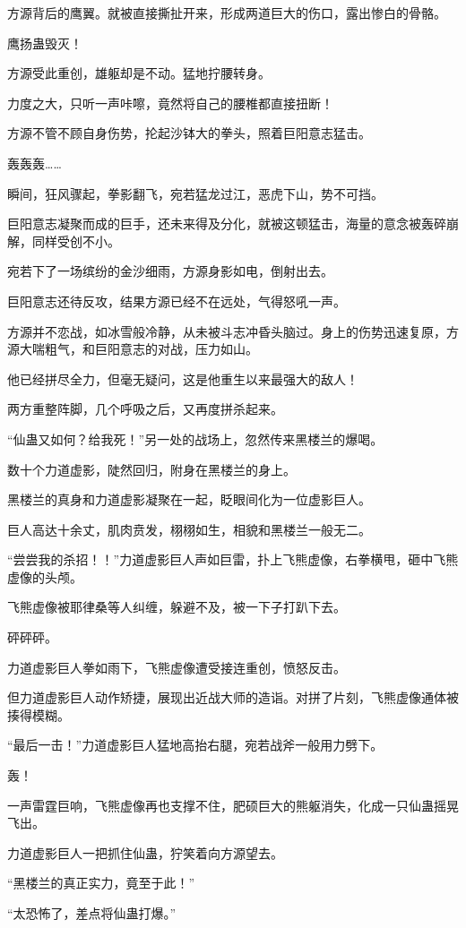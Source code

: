 \begin{this_body}
方源背后的鹰翼。就被直接撕扯开来，形成两道巨大的伤口，露出惨白的骨骼。

鹰扬蛊毁灭！

方源受此重创，雄躯却是不动。猛地拧腰转身。

力度之大，只听一声咔嚓，竟然将自己的腰椎都直接扭断！

方源不管不顾自身伤势，抡起沙钵大的拳头，照着巨阳意志猛击。

轰轰轰……

瞬间，狂风骤起，拳影翻飞，宛若猛龙过江，恶虎下山，势不可挡。

巨阳意志凝聚而成的巨手，还未来得及分化，就被这顿猛击，海量的意念被轰碎崩解，同样受创不小。

宛若下了一场缤纷的金沙细雨，方源身影如电，倒射出去。

巨阳意志还待反攻，结果方源已经不在远处，气得怒吼一声。

方源并不恋战，如冰雪般冷静，从未被斗志冲昏头脑过。身上的伤势迅速复原，方源大喘粗气，和巨阳意志的对战，压力如山。

他已经拼尽全力，但毫无疑问，这是他重生以来最强大的敌人！

两方重整阵脚，几个呼吸之后，又再度拼杀起来。

“仙蛊又如何？给我死！”另一处的战场上，忽然传来黑楼兰的爆喝。

数十个力道虚影，陡然回归，附身在黑楼兰的身上。

黑楼兰的真身和力道虚影凝聚在一起，眨眼间化为一位虚影巨人。

巨人高达十余丈，肌肉贲发，栩栩如生，相貌和黑楼兰一般无二。

“尝尝我的杀招！！”力道虚影巨人声如巨雷，扑上飞熊虚像，右拳横甩，砸中飞熊虚像的头颅。

飞熊虚像被耶律桑等人纠缠，躲避不及，被一下子打趴下去。

砰砰砰。

力道虚影巨人拳如雨下，飞熊虚像遭受接连重创，愤怒反击。

但力道虚影巨人动作矫捷，展现出近战大师的造诣。对拼了片刻，飞熊虚像通体被揍得模糊。

“最后一击！”力道虚影巨人猛地高抬右腿，宛若战斧一般用力劈下。

轰！

一声雷霆巨响，飞熊虚像再也支撑不住，肥硕巨大的熊躯消失，化成一只仙蛊摇晃飞出。

力道虚影巨人一把抓住仙蛊，狞笑着向方源望去。

“黑楼兰的真正实力，竟至于此！”

“太恐怖了，差点将仙蛊打爆。”


\end{this_body}
